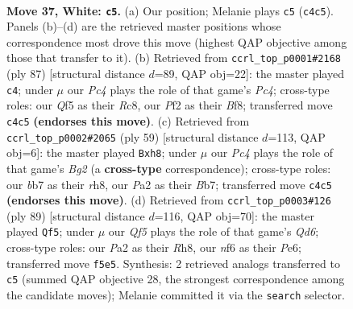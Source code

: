 \documentclass[11pt]{article}
\begin{document}
\clearpage

\begin{figure}[p]\centering
\begin{subfigure}{0.46\textwidth}\centering
\resizebox{\linewidth}{!}{%
\newchessgame
\chessboard[
  setfen={3q2k1/1b1n1p2/1p1P1n2/5Q1p/p1P3pP/6P1/PB3P2/R5K1 w - - 5 37},
  showmover=false,
  pgfstyle=straightmove, color=movearrow, markmove={c4-c5}
]}
\caption{}
\end{subfigure}\hfill
\begin{subfigure}{0.46\textwidth}\centering
\resizebox{\linewidth}{!}{%
\newchessgame
\chessboard[
  setfen={2r2bk1/5p2/2N3p1/2pPN2p/p3P2q/P2Q3P/5PP1/6K1 b - - 0 44},
  showmover=false,
  pgfstyle=straightmove, color=movearrow, markmove={c5-c4}
]}
\caption{}
\end{subfigure}
\\[4pt]
\begin{subfigure}{0.46\textwidth}\centering
\resizebox{\linewidth}{!}{%
\newchessgame
\chessboard[
  setfen={4k2R/1b3pb1/p1r3p1/qN1p2P1/3P4/P2B1N2/1K3P2/7Q b - - 1 30},
  showmover=false,
  pgfstyle=straightmove, color=movearrow, markmove={g7-h8}
]}
\caption{}
\end{subfigure}\hfill
\begin{subfigure}{0.46\textwidth}\centering
\resizebox{\linewidth}{!}{%
\newchessgame
\chessboard[
  setfen={5k1r/8/4pPp1/p2pQ3/bb1P1P1p/3q1N1P/3N1BP1/6K1 b - - 2 45},
  showmover=false,
  pgfstyle=straightmove, color=movearrow, markmove={d3-f5}
]}
\caption{}
\end{subfigure}
\caption{\textbf{Move 37, White: \texttt{c5}.} (a) Our position; Melanie plays \texttt{c5} (\texttt{c4c5}). Panels (b)--(d) are the retrieved master positions whose correspondence most drove this move (highest QAP objective among those that transfer to it). (b) Retrieved from \texttt{ccrl\_top\_p0001\#2168} (ply 87) [structural distance $d$=89, QAP obj=22]: the master played \texttt{c4}; under $\mu$ our \emph{Pc4} plays the role of that game's \emph{Pc4}; cross-type roles: our \emph{Q}f5 as their \emph{R}c8, our \emph{P}f2 as their \emph{B}f8; transferred move \texttt{c4c5} \textbf{(endorses this move)}. (c) Retrieved from \texttt{ccrl\_top\_p0002\#2065} (ply 59) [structural distance $d$=113, QAP obj=6]: the master played \texttt{Bxh8}; under $\mu$ our \emph{Pc4} plays the role of that game's \emph{Bg2} (a \textbf{cross-type} correspondence); cross-type roles: our \emph{b}b7 as their \emph{r}h8, our \emph{P}a2 as their \emph{B}b7; transferred move \texttt{c4c5} \textbf{(endorses this move)}. (d) Retrieved from \texttt{ccrl\_top\_p0003\#126} (ply 89) [structural distance $d$=116, QAP obj=70]: the master played \texttt{Qf5}; under $\mu$ our \emph{Qf5} plays the role of that game's \emph{Qd6}; cross-type roles: our \emph{P}a2 as their \emph{R}h8, our \emph{n}f6 as their \emph{P}e6; transferred move \texttt{f5e5}. Synthesis: 2 retrieved analogs transferred to \texttt{c5} (summed QAP objective 28, the strongest correspondence among the candidate moves); Melanie committed it via the \texttt{search} selector.}
\label{fig:thought-m72}
\end{figure}
\end{document}
